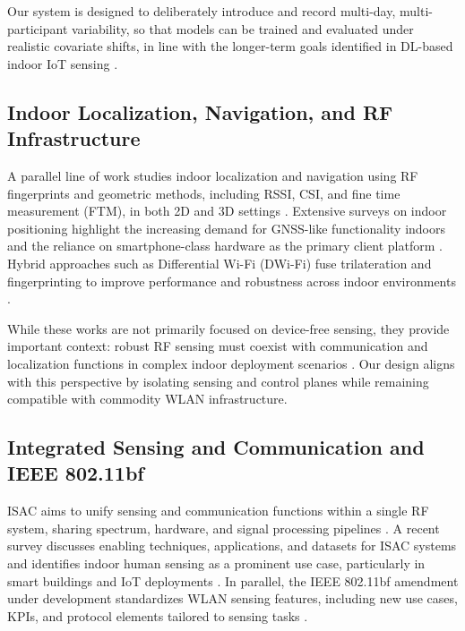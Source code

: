 \documentclass[11pt,a4paper]{article}
\begin{document}
Our system is designed to deliberately introduce and record multi-day, multi-participant variability, so that models can be trained and evaluated under realistic covariate shifts, in line with the longer-term goals identified in DL-based indoor IoT sensing \cite{abdelbasset2021indoor}.

\subsection{Indoor Localization, Navigation, and RF Infrastructure}

A parallel line of work studies indoor localization and navigation using RF fingerprints and geometric methods, including RSSI, CSI, and fine time measurement (FTM), in both 2D and 3D settings \cite{sesyuk2022indoor}. Extensive surveys on indoor positioning highlight the increasing demand for GNSS-like functionality indoors and the reliance on smartphone-class hardware as the primary client platform \cite{retscher2022indoor}. Hybrid approaches such as Differential Wi-Fi (DWi-Fi) fuse trilateration and fingerprinting to improve performance and robustness across indoor environments \cite{retscher2017dwifi}.

While these works are not primarily focused on device-free sensing, they provide important context: robust RF sensing must coexist with communication and localization functions in complex indoor deployment scenarios \cite{sesyuk2022indoor,retscher2017dwifi,retscher2022indoor}. Our design aligns with this perspective by isolating sensing and control planes while remaining compatible with commodity WLAN infrastructure.

\subsection{Integrated Sensing and Communication and IEEE 802.11bf}

ISAC aims to unify sensing and communication functions within a single RF system, sharing spectrum, hardware, and signal processing pipelines \cite{wang2022isac}. A recent survey discusses enabling techniques, applications, and datasets for ISAC systems and identifies indoor human sensing as a prominent use case, particularly in smart buildings and IoT deployments \cite{wang2022isac}. In parallel, the IEEE 802.11bf amendment under development standardizes WLAN sensing features, including new use cases, KPIs, and protocol elements tailored to sensing tasks \cite{du2023bf}.
\end{document}
